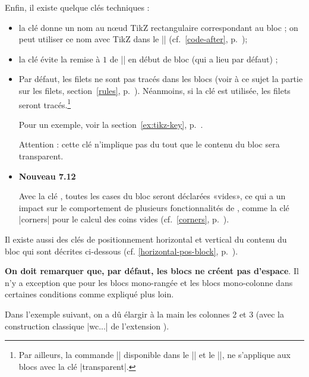 \documentclass[dvipsnames]{article}
\newcommand{\interitem}{\vspace{7mm plus 2mm minus 3mm}}
\begin{document}
\medskip
Enfin, il existe quelque clés techniques :
\begin{itemize}[beginpenalty=10000]
\item {}
la clé  donne un nom au nœud TikZ rectangulaire
correspondant au bloc ; on peut utiliser ce nom avec TikZ dans le |\CodeAfter|
(cf.~\ref{code-after}, p.~\pageref{code-after});
\item {}
la clé  évite la remise à $1$ de
|\arraystretch| en début de bloc (qui a lieu par défaut) ;
\item {}
Par défaut, les filets ne sont pas tracés dans les blocs (voir à ce sujet
la partie sur les filets, section~\ref{rules}, p.~\pageref{rules}). Néanmoins, si
la clé  est utilisée, les filets seront tracés.\footnote{Par
ailleurs, la commande |\TikzEveryCell| disponible dans le |\CodeAfter| et le
|\CodeBefore|, ne s'applique aux blocs avec la clé |transparent|.}

Pour un exemple, voir la section~\ref{ex:tikz-key}, p.~\pageref{ex:tikz-key}. 

Attention : cette clé n'implique pas du tout que le contenu du bloc sera
transparent.

\item {}

\colorbox{yellow!50}{\textbf{Nouveau 7.12}}

\nobreak
Avec la clé , toutes les cases du bloc seront déclarées «vides»,
ce qui a un impact sur le comportement de plusieurs fonctionnalités de ,
comme la clé |corners| pour le calcul des coins vides (cf.~\ref{corners},
p.~\pageref{corners}).
\end{itemize}

Il existe aussi des clés de positionnement horizontal et vertical du contenu du
bloc qui sont décrites ci-dessous (cf. \ref{horizontal-pos-block},
p.~\pageref{horizontal-pos-block}).


\interitem
\textbf{On doit remarquer que, par défaut, les blocs ne créent pas d'espace}. Il
n'y a exception que pour les blocs mono-rangée et les blocs mono-colonne dans
certaines conditions comme expliqué plus loin.


\medskip
Dans l'exemple suivant, on a dû élargir à la main les colonnes 2 et 3 (avec la
construction classique |w{c}{...}| de l'extension ).
\end{document}
